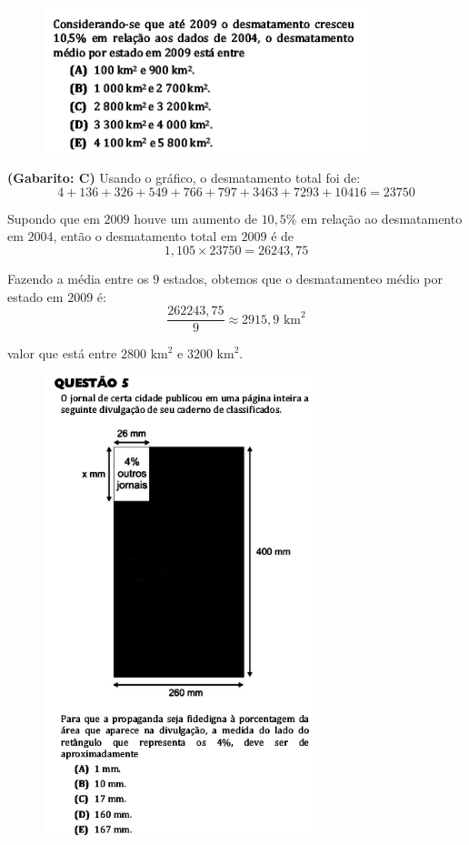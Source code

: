 \documentclass[a4paper]{article}
\begin{document}
\begin{figure}[H]
	\begin{center}
		\includegraphics[width=9.5cm]{L3Q4_2.png}
	\end{center}
\end{figure}
\par\textbf{(Gabarito: C)} Usando o gráfico, o desmatamento total foi de:
\begin{equation*}
4+136+326+549+766+797+3463+7293+10416 = 23750
\end{equation*} 
\par\vspace{0.3cm} Supondo que em $2009$ houve um aumento de $10,5\%$ em relação ao desmatamento em $2004$, então o desmatamento total em $2009$ é de
\begin{equation*}
1,105\times 23750 = 26243,75
\end{equation*}
\par\vspace{0.3cm} Fazendo a média entre os $9$ estados, obtemos que o desmatamenteo médio por estado em $2009$ é:
\begin{equation*}
\frac{262243,75}{9} \approx 2915,9\text{ km}^2
\end{equation*}
\par\vspace{0.3cm} valor que está entre $2800\text{ km}^2$ e $3200\text{ km}^2$.
\begin{figure}[H]
	\begin{center}
		\includegraphics[width=8cm]{L3Q5.png}
	\end{center}
\end{figure}
\end{document}
